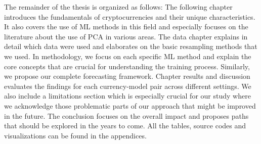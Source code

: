 The remainder of the thesis is organized as follows: 
The following chapter introduces the fundamentals of cryptocurrencies and their unique characteristics.
It also covers the use of \ac{ML} methods in this field and especially focuses on the literature about
the use of \ac{PCA} in various areas. The data chapter explains in detail which data were used 
and elaborates on the basic resampling methods that we used. In methodology, we focus on each specific
\ac{ML} method and explain the core concepts that are crucial for understanding the training process. 
Similarly, we propose our complete forecasting framework. Chapter results and discussion evaluates
the findings for each currency-model pair across different settings. We also include a limitations
section which is especially crucial for our study where we acknowledge those problematic parts of our approach 
that might be improved in the future. The conclusion focuses on the overall impact and proposes
paths that should be explored in the years to come. All the tables, source codes and visualizations
can be found in the appendices.
